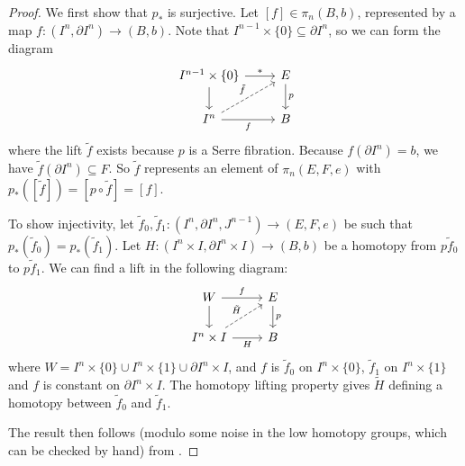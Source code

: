 \documentclass[ma3408.tex]{subfiles}
\begin{document}
\begin{proof}
	We first show that $p_*$ is surjective. Let $[f] \in \pi_n(B,b)$, represented by a map $f \colon (I^n, \partial I^n) \to (B,b)$. Note that $I^{n-1} \times \{ 0 \} \subseteq \partial I^n$, so we can form the diagram
\[\begin{tikzcd}
	{I^{n-1} \times \{ 0 \}} & E \\
	{I^n} & B
	\arrow["f"', from=2-1, to=2-2]
	\arrow["p", from=1-2, to=2-2]
	\arrow[from=1-1, to=2-1]
	\arrow["\ast", from=1-1, to=1-2]
	\arrow["\tilde f", dashed, from=2-1, to=1-2]
\end{tikzcd}\]
where the lift $\tilde f$ exists because $p$ is a Serre fibration. Because $f(\partial I^n) = b$, we have $\tilde f(\partial I^n) \subseteq F$. So $\tilde f $ represents an element of $\pi_n(E,F,e)$ with $p_*([\tilde f]) = [p \circ \tilde f] =[f]$. 

To show injectivity, let $\tilde f_0,\tilde f_1 \colon (I^n,\partial I^n,J^{n-1}) \to (E,F,e)$ be such that $p_*(\tilde f_0) = p_*(\tilde f_1)$. Let $H \colon (I^n 
\times I,\partial I^n \times I) \to (B,b)$ be a homotopy from $p\tilde f_0$ to $p \tilde f_1$. We can find a lift in the following diagram:
\[\begin{tikzcd}
	W & E \\
	{I^n \times I} & B
	\arrow["H"', from=2-1, to=2-2]
	\arrow["p", from=1-2, to=2-2]
	\arrow[from=1-1, to=2-1]
	\arrow["f", from=1-1, to=1-2]
	\arrow["{\tilde H}", dashed, from=2-1, to=1-2]
\end{tikzcd}\]
where $W = I^n \times \{ 0 \} \cup I^n \times \{ 1 \} \cup \partial I^n \times I$, and $f$ is $\tilde f_0$ on $I^n \times \{ 0 \}$, $\tilde f_1$ on $I^n \times \{ 1 \}$ and $f$ is constant on $\partial I^n \times I$. The homotopy lifting property gives $\tilde H$ defining a homotopy between $\tilde f_0$ and $\tilde f_1$. 

The result then follows (modulo some noise in the low homotopy groups, which can be checked by hand) from . 
\end{proof}
\end{document}
